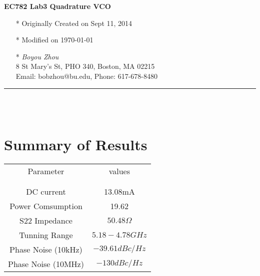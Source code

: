 \documentclass[]{article}
\begin{document}
\pagestyle{empty}
{\large\textbf{EC782 Lab3 Quadrature VCO}}


    \begin{itemize}
        \item[*] Originally Created on Sept 11, 2014
        \item[*] Modified on \today
        \item[*] \textit {Boyou Zhou}\\
                 8 St Mary's St, PHO 340, Boston, MA 02215\\
                 Email: bobzhou@bu.edu, Phone: 617-678-8480
                    
    \end{itemize}

%


\rule[-0.1cm]{7.5in}{0.01cm}\\
\\
\indent		             
\section {Summary of Results}

\begin{center}
    \begin{tabular}{c c}
        Parameter & values \\ \\ \hline \\
        DC current & 13.08mA \\
        Power Comsumption & 19.62 \\
        S22 Impedance & $50.48\Omega$ \\
        Tunning Range & $5.18 - 4.78 GHz$ \\
        Phase Noise (10kHz) & $-39.61dBc/Hz$ \\
        Phase Noise (10MHz) & $-130dBc/Hz$
    \end{tabular}
\end{center}
\end{document}

